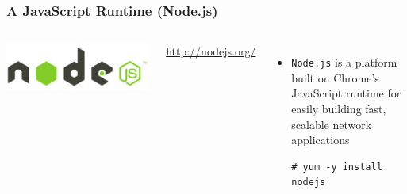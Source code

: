 \documentclass{beamer}
\begin{document}
\begin{frame}[fragile]
\frametitle{A JavaScript Runtime (Node.js)}
\begin{columns}
    \href{http://nodejs.org/}{\includegraphics[width = 1.0 \textwidth]{nodejs.eps}}
  
    \url{http://nodejs.org/}
  \begin{itemize}
   \item \texttt{Node.js} is a platform built on Chrome's JavaScript runtime for easily building fast, scalable network applications
   \lstset{language=shell, escapechar=!}
\begin{lstlisting}[escapechar=!]
# yum -y install nodejs
\end{lstlisting}
  \end{itemize}
\end{columns}


\end{frame}
\end{document}
